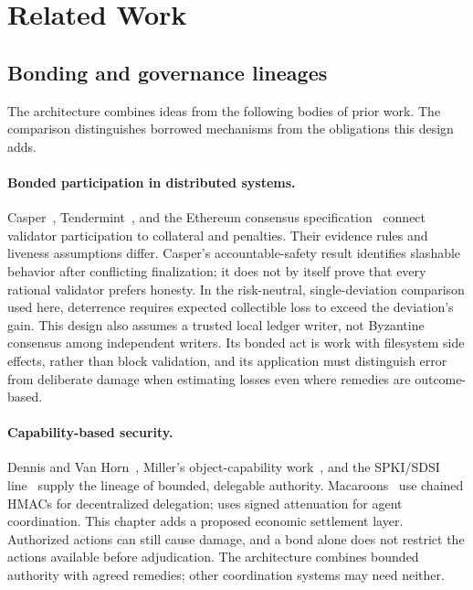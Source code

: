 \documentclass[11pt,a4paper]{article}
\theoremstyle{definition}
\theoremstyle{remark}
\begin{document}
\pdmarginpagebreak
\section{Related Work}\label{sec:related}

\subsection{Bonding and governance lineages}\label{sec:related-bonding}
The architecture combines ideas from the following bodies of prior work. The comparison distinguishes borrowed mechanisms from the obligations this design adds.
\paragraph{Bonded participation in distributed systems.} Casper~, Tendermint~, and the Ethereum consensus specification~ connect validator participation to collateral and penalties. Their evidence rules and liveness assumptions differ. Casper's accountable-safety result identifies slashable behavior after conflicting finalization; it does not by itself prove that every rational validator prefers honesty. In the risk-neutral, single-deviation comparison used here, deterrence requires expected collectible loss to exceed the deviation's gain. This design also assumes a trusted local ledger writer, not Byzantine consensus among independent writers. Its bonded act is work with filesystem side effects, rather than block validation, and its application must distinguish error from deliberate damage when estimating losses even where remedies are outcome-based.
\paragraph{Capability-based security.} Dennis and Van Horn~, Miller's object-capability work~, and the SPKI/SDSI line~ supply the lineage of bounded, delegable authority. Macaroons~ use chained HMACs for decentralized delegation;  uses signed attenuation for agent coordination. This chapter adds a proposed economic settlement layer. Authorized actions can still cause damage, and a bond alone does not restrict the actions available before adjudication. The architecture combines bounded authority with agreed remedies; other coordination systems may need neither.
\end{document}

